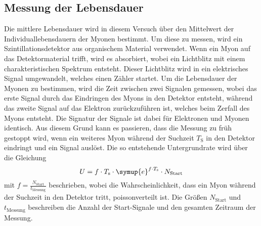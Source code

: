 \subsection{Messung der Lebensdauer}

Die mittlere Lebensdauer wird in diesem Versuch über den Mittelwert der Individuallebensdauern der Myonen bestimmt.
Um diese zu messen,
wird ein Szintillationsdetektor aus organischem Material verwendet.
Wenn ein Myon auf das Detektormaterial trifft,
wird es absorbiert,
wobei ein Lichtblitz mit einem charakteristischen Spektrum entsteht.
Dieser Lichtblitz wird in ein elektrisches Signal umgewandelt,
welches einen Zähler startet.
Um die Lebensdauer der Myonen zu bestimmen, 
wird die Zeit zwischen zwei Signalen gemessen,
wobei das erste Signal durch das Eindringen des Myons in den Detektor entsteht,
während das zweite Signal auf das Elektron zurückzuführen ist,
welches beim Zerfall des Myons entsteht.
Die Signatur der Signale ist dabei für Elektronen und Myonen identisch.
Aus diesem Grund kann es passieren,
dass die Messung zu früh gestoppt wird,
wenn ein weiteres Myon während der Suchzeit $T_\text{S}$ in den Detektor eindringt und ein Signal auslöst. 
Die so entstehende Untergrundrate wird über die Gleichung
\begin{equation}
    U = f \cdot T_\text{s} \cdot \symup{e}^{f \cdot T_\text{s}} \cdot N_\text{Start} 
\end{equation}
mit $f = \frac{N_\text{Start}}{t_\text{Messung}}$ beschrieben, 
wobei die Wahrscheinlichkeit, 
dass ein Myon während der Suchzeit in den Detektor tritt,
poissonverteilt ist.
Die Größen $N_\text{Start}$ und $t_\text{Messung}$ beschreiben die Anzahl der Start-Signale und den gesamten Zeitraum der Messung.

